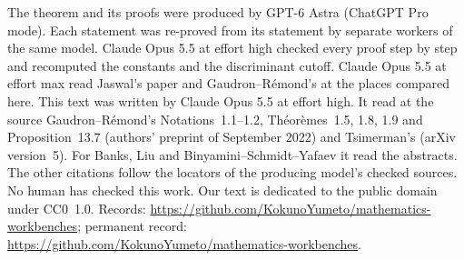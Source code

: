 \documentclass[11pt,a4paper]{article}
\theoremstyle{plain}
\theoremstyle{remark}
\newcommand{\workbenchurl}{https://github.com/KokunoYumeto/mathematics-workbenches}
\newcommand{\recordurl}{https://github.com/KokunoYumeto/mathematics-workbenches}
\begin{document}
The theorem and its proofs were produced by GPT-6 Astra (ChatGPT Pro mode). Each statement was re-proved from its
statement by separate workers of the same model. Claude Opus 5.5 at effort high checked every proof step by step and
recomputed the constants and the discriminant cutoff. Claude Opus 5.5 at effort max read Jaswal's paper and Gaudron--R\'emond's at the
places compared here. This text was written by Claude Opus 5.5 at effort high. It read at the source
Gaudron--R\'emond's Notations~1.1--1.2, Th\'eor\`emes~1.5, 1.8, 1.9 and Proposition~13.7 (authors' preprint of
September 2022) and Tsimerman's \cite{Ts18} (arXiv version~5). For Banks, Liu and Binyamini--Schmidt--Yafaev it read
the abstracts. The other citations follow the locators of the producing model's checked sources. No human has
checked this work. Our text is dedicated to the public domain under CC0~1.0. Records: \url{\workbenchurl}; permanent
record: \url{\recordurl}.
\end{document}

